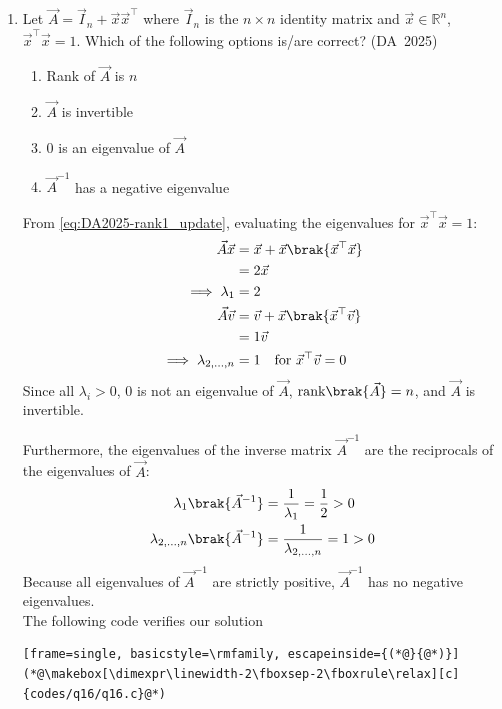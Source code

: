 \begin{enumerate}[label=\thesubsection.\arabic*, ref=\thesubsection.\theenumi]
\item 
Let $\vec{A} = \vec{I}_n + \vec{x}\vec{x}^{\top}$ where $\vec{I}_n$ is the $n \times n$ identity matrix and $\vec{x} \in \mathbb{R}^n$, $\vec{x}^{\top}\vec{x} = 1$. Which of the following options is/are correct?
\hfill (DA~2025)
\begin{enumerate}
	\item Rank of $\vec{A}$ is $n$
	\item $\vec{A}$ is invertible
	\item $0$ is an eigenvalue of $\vec{A}$
	\item $\vec{A}^{-1}$ has a negative eigenvalue
\end{enumerate}
\solution
From \eqref{eq:DA2025-rank1_update}, evaluating the eigenvalues for $\vec{x}^\top\vec{x} = 1$:
\begin{align}
	\vec{A}\vec{x} &= \vec{x} + \vec{x}\brak{\vec{x}^\top\vec{x}}
	\\
	&= 2\vec{x}
	\\
	\implies \lambda_1 &= 2
	\\
	\vec{A}\vec{v} &= \vec{v} + \vec{x}\brak{\vec{x}^\top\vec{v}}
	\\
	&= 1\vec{v}
	\\
	\implies \lambda_{2,\dots,n} &= 1 \quad \text{for } \vec{x}^\top\vec{v} = 0
\end{align}
Since all $\lambda_i > 0$, $0$ is not an eigenvalue of $\vec{A}$, $\text{rank}\brak{\vec{A}} = n$, and $\vec{A}$ is invertible.

Furthermore, the eigenvalues of the inverse matrix $\vec{A}^{-1}$ are the reciprocals of the eigenvalues of $\vec{A}$:
\begin{align}
	\lambda_1\brak{\vec{A}^{-1}} &= \frac{1}{\lambda_1} = \frac{1}{2} > 0
	\\
	\lambda_{2,\dots,n}\brak{\vec{A}^{-1}} &= \frac{1}{\lambda_{2,\dots,n}} = 1 > 0
\end{align}
Because all eigenvalues of $\vec{A}^{-1}$ are strictly positive, $\vec{A}^{-1}$ has no negative eigenvalues. 
	\\
		The following code verifies our solution
	\begin{lstlisting}[frame=single, basicstyle=\rmfamily, escapeinside={(*@}{@*)}]
(*@\makebox[\dimexpr\linewidth-2\fboxsep-2\fboxrule\relax][c]{codes/q16/q16.c}@*)
	\end{lstlisting}
	

\end{enumerate}
